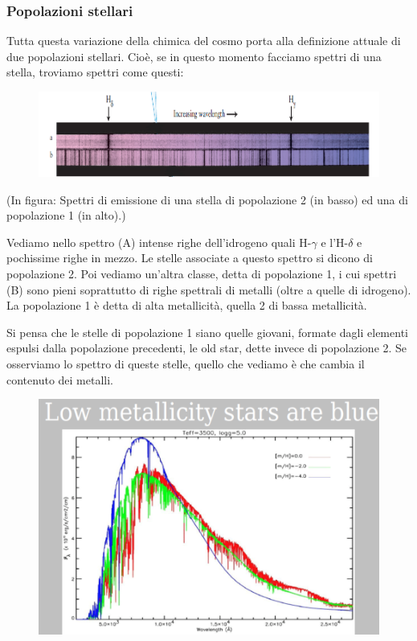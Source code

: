 \subsubsection{Popolazioni stellari}

Tutta questa variazione della chimica del cosmo porta alla definizione attuale di due popolazioni stellari. Cioè, se in questo momento facciamo spettri di una stella, troviamo spettri come questi:

\begin{figure}[H]
    \centering
    \includegraphics[width=12cm]{lezione 28 novembre/popolazionistellari1.png}
    \label{lezione 28 novembre/popolazionistellari1.png}
\end{figure}

(In figura: Spettri di emissione di una stella di popolazione 2 (in basso) ed una di popolazione 1 (in alto).)

Vediamo nello spettro (A) intense righe dell'idrogeno quali H-$\gamma$ e l'H-$\delta$ e pochissime righe in mezzo. Le stelle associate a questo spettro si dicono di popolazione 2. Poi vediamo un'altra classe, detta di popolazione 1, i cui spettri (B) sono pieni soprattutto di righe spettrali di metalli (oltre a quelle di idrogeno). La popolazione 1 è detta di alta metallicità, quella 2 di bassa metallicità.

Si pensa che le stelle di popolazione 1 siano quelle giovani, formate dagli elementi espulsi dalla popolazione precedenti, le old star, dette invece di popolazione 2. Se osserviamo lo spettro di queste stelle, quello che vediamo è che cambia il contenuto dei metalli.

\begin{figure}[H]
    \centering
    \includegraphics[width=12cm]{lezione 28 novembre/bassametallicita.png}
    \label{lezione 28 novembre/bassametallicita.png}
\end{figure}

